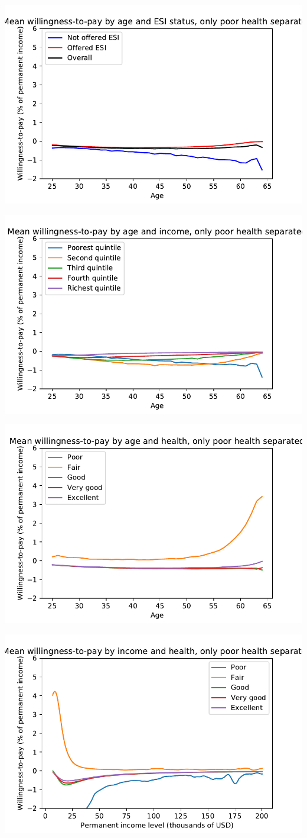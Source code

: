 \documentclass[12pt,pdftex,letterpaper]{article}
\begin{document}
\includegraphics{WTPbyAgeOfferPoorHealthExcluded.pdf}

\includegraphics{WTPbyAgeIncomePoorHealthExcluded.pdf}

\includegraphics{WTPbyAgeHealthPoorHealthExcluded.pdf}

\includegraphics{WTPbyIncomeHealthPoorHealthExcluded.pdf}
\end{document}
